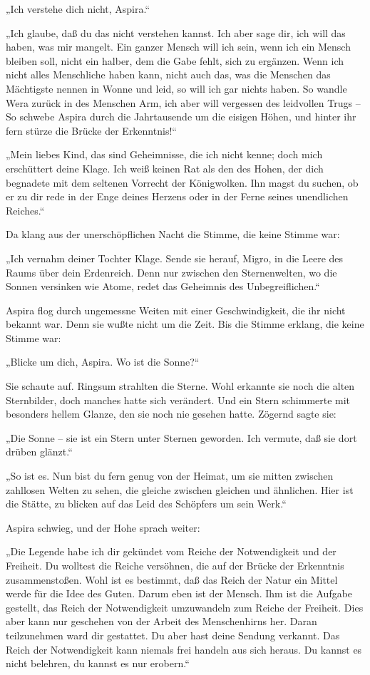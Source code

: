 „Ich verstehe dich nicht, Aspira.“

„Ich glaube, daß du das nicht verstehen kannst. Ich aber sage dir,
ich will das haben, was mir mangelt. Ein ganzer Mensch will ich
sein, wenn ich ein Mensch bleiben soll, nicht ein halber, dem die
Gabe fehlt, sich zu ergänzen. Wenn ich nicht alles Menschliche
haben kann, nicht auch das, was die Menschen das Mächtigste nennen
in Wonne und leid, so will ich gar nichts haben. So wandle Wera
zurück in des Menschen Arm, ich aber will vergessen des leidvollen
Trugs – So schwebe Aspira durch die Jahrtausende um die eisigen
Höhen, und hinter ihr fern stürze die Brücke der Erkenntnis!“

„Mein liebes Kind, das sind Geheimnisse, die ich nicht kenne; doch
mich erschüttert deine Klage. Ich weiß keinen Rat als den des
Hohen, der dich begnadete mit dem seltenen Vorrecht der
Königwolken. Ihn magst du suchen, ob er zu dir rede in der Enge
deines Herzens oder in der Ferne seines unendlichen Reiches.“

Da klang aus der unerschöpflichen Nacht die Stimme, die keine
Stimme war:

„Ich vernahm deiner Tochter Klage. Sende sie herauf, Migro, in die
Leere des Raums über dein Erdenreich. Denn nur zwischen den
Sternenwelten, wo die Sonnen versinken wie Atome, redet das
Geheimnis des Unbegreiflichen.“

Aspira flog durch ungemessne Weiten mit einer Geschwindigkeit, die
ihr nicht bekannt war. Denn sie wußte nicht um die Zeit. Bis die
Stimme erklang, die keine Stimme war:

„Blicke um dich, Aspira. Wo ist die Sonne?“

Sie schaute auf. Ringsum strahlten die Sterne. Wohl erkannte sie
noch die alten Sternbilder, doch manches hatte sich verändert. Und
ein Stern schimmerte mit besonders hellem Glanze, den sie noch nie
gesehen hatte. Zögernd sagte sie:

„Die Sonne – sie ist ein Stern unter Sternen geworden. Ich vermute,
daß sie dort drüben glänzt.“

„So ist es. Nun bist du fern genug von der Heimat, um sie mitten
zwischen zahllosen Welten zu sehen, die gleiche zwischen gleichen
und ähnlichen. Hier ist die Stätte, zu blicken auf das Leid des
Schöpfers um sein Werk.“

Aspira schwieg, und der Hohe sprach weiter:

„Die Legende habe ich dir gekündet vom Reiche der Notwendigkeit und
der Freiheit. Du wolltest die Reiche versöhnen, die auf der Brücke
der Erkenntnis zusammenstoßen. Wohl ist es bestimmt, daß das Reich
der Natur ein Mittel werde für die Idee des Guten. Darum eben ist
der Mensch. Ihm ist die Aufgabe gestellt, das Reich der
Notwendigkeit umzuwandeln zum Reiche der Freiheit. Dies aber kann
nur geschehen von der Arbeit des Menschenhirns her. Daran
teilzunehmen ward dir gestattet. Du aber hast deine Sendung
verkannt. Das Reich der Notwendigkeit kann niemals frei handeln aus
sich heraus. Du kannst es nicht belehren, du kannst es nur
erobern.“

